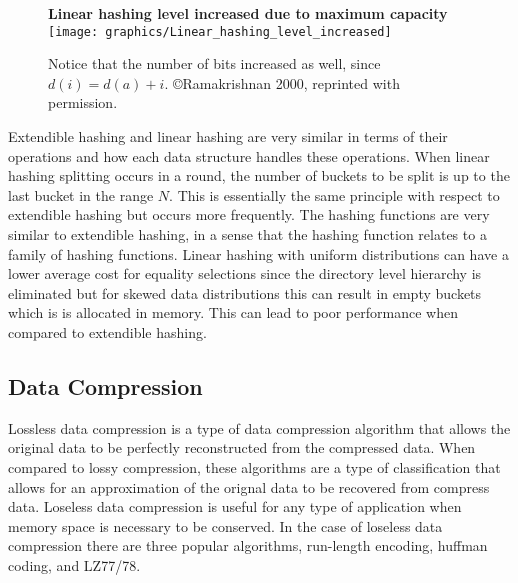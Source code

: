 \documentclass[letterpaper, 11pt]{article}
\begin{document}
\begin{figure}
  \centering
  \textbf{Linear hashing level increased due to maximum capacity}
  \texttt{[image: graphics/Linear\_hashing\_level\_increased]}
  \caption{Notice that the number of bits increased as well, since $d(i) = d(a) + i$.  \copyright Ramakrishnan 2000, reprinted with permission.\cite{ramakrishnan2000database}}
  \label{fig:linear_hash_level_inc}
\end{figure}

Extendible hashing and linear hashing are very similar in terms of their operations and 
how each data structure handles these operations. When linear hashing splitting occurs in a round, the 
number of buckets to be split is up to the last bucket in the range $N$. This is essentially the same 
principle with respect to extendible hashing but occurs more frequently. The hashing functions are 
very similar to extendible hashing, in a sense that the hashing function relates to a family of 
hashing functions. Linear hashing with uniform distributions can have a lower average cost for 
equality selections since the directory level hierarchy is eliminated but for skewed data 
distributions this can result in empty buckets which is is allocated in memory. This can lead 
to poor performance when compared to extendible hashing.

\subsection{Data Compression}
Lossless data compression is a type of data compression algorithm that allows
the original data to be perfectly reconstructed from the compressed data. When
compared to lossy compression, these algorithms are a type of classification that
allows for an approximation of the orignal data to be recovered from compress data.
Loseless data compression is useful for any type of application when memory space is
necessary to be conserved. In the case of loseless data compression there are three
popular algorithms, run-length encoding, huffman coding, and LZ77/78.
\par\vspace{\baselineskip}
\end{document}
